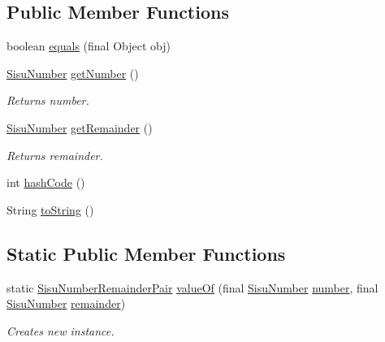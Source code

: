 \subsection*{Public Member Functions}
\begin{DoxyCompactItemize}
\item 
boolean \hyperlink{classcom_1_1aarrelaakso_1_1drawl_1_1_sisu_number_remainder_pair_ad019d3d5cbc76e6e66b92f6e7aed6794}{equals} (final Object obj)
\item 
\hyperlink{classcom_1_1aarrelaakso_1_1drawl_1_1_sisu_number}{Sisu\+Number} \hyperlink{classcom_1_1aarrelaakso_1_1drawl_1_1_sisu_number_remainder_pair_a0811842d4cf4746c09c81fca090f98e1}{get\+Number} ()
\begin{DoxyCompactList}\small\item\em Returns number. \end{DoxyCompactList}\item 
\hyperlink{classcom_1_1aarrelaakso_1_1drawl_1_1_sisu_number}{Sisu\+Number} \hyperlink{classcom_1_1aarrelaakso_1_1drawl_1_1_sisu_number_remainder_pair_a2fb5bd3f444211337da3ce927b821c56}{get\+Remainder} ()
\begin{DoxyCompactList}\small\item\em Returns remainder. \end{DoxyCompactList}\item 
int \hyperlink{classcom_1_1aarrelaakso_1_1drawl_1_1_sisu_number_remainder_pair_a1cb5209ed6a95a1337fea5f4c9709b33}{hash\+Code} ()
\item 
String \hyperlink{classcom_1_1aarrelaakso_1_1drawl_1_1_sisu_number_remainder_pair_a0468d2a2b1f5db91a39390dbc18de7a8}{to\+String} ()
\end{DoxyCompactItemize}
\subsection*{Static Public Member Functions}
\begin{DoxyCompactItemize}
\item 
static \hyperlink{classcom_1_1aarrelaakso_1_1drawl_1_1_sisu_number_remainder_pair}{Sisu\+Number\+Remainder\+Pair} \hyperlink{classcom_1_1aarrelaakso_1_1drawl_1_1_sisu_number_remainder_pair_aa489b0cd18117d9c7d4994ec60af0984}{value\+Of} (final \hyperlink{classcom_1_1aarrelaakso_1_1drawl_1_1_sisu_number}{Sisu\+Number} \hyperlink{classcom_1_1aarrelaakso_1_1drawl_1_1_sisu_number_remainder_pair_a7ff7c95e41cb9dfbccb419fc75d05706}{number}, final \hyperlink{classcom_1_1aarrelaakso_1_1drawl_1_1_sisu_number}{Sisu\+Number} \hyperlink{classcom_1_1aarrelaakso_1_1drawl_1_1_sisu_number_remainder_pair_a2db9bc3ff60d0078b3341f75dd830890}{remainder})
\begin{DoxyCompactList}\small\item\em Creates new instance. \end{DoxyCompactList}\end{DoxyCompactItemize}
